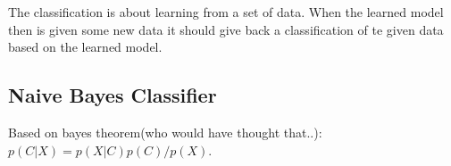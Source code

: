 The classification is about learning from a set of data.
When the learned model then is given some new data it should give back a classification of te given data based on the learned model.
\subsection{Naive Bayes Classifier}
Based on bayes theorem(who would have thought that..):
$p(C|X) = p(X|C)p(C)/p(X)$.

